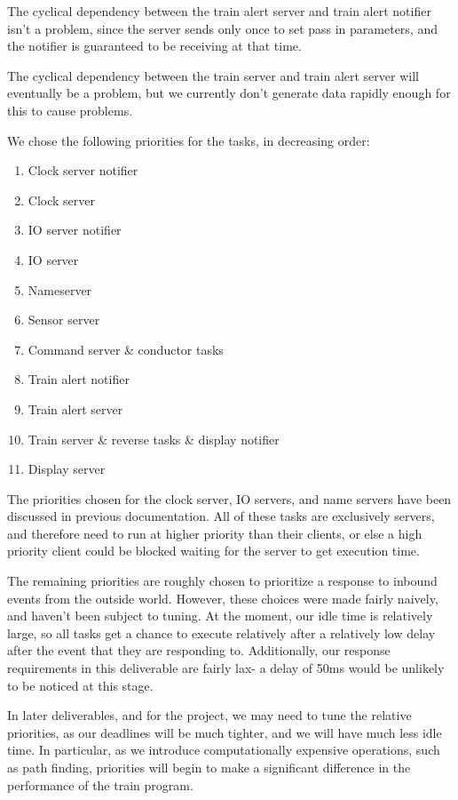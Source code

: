 \documentclass[titlepage]{article}
\begin{document}
The cyclical dependency between the train alert server and train alert notifier
isn't a problem, since the server sends only once to set pass in parameters, and
the notifier is guaranteed to be receiving at that time.

The cyclical dependency between the train server and train alert server will
eventually be a problem, but we currently don't generate data rapidly enough for
this to cause problems.

We chose the following priorities for the tasks, in decreasing order:

\begin{enumerate}
\item Clock server notifier
\item Clock server
\item IO server notifier
\item IO server
\item Nameserver
\item Sensor server
\item Command server \& conductor tasks
\item Train alert notifier
\item Train alert server
\item Train server \& reverse tasks \& display notifier
\item Display server
\end{enumerate}

The priorities chosen for the clock server, IO servers, and name servers have been
discussed in previous documentation.
All of these tasks are exclusively servers, and therefore need to run at higher
priority than their clients, or else a high priority client could be blocked waiting
for the server to get execution time.

The remaining priorities are roughly chosen to prioritize a response to inbound events from
the outside world.
However, these choices were made fairly naively, and haven't been subject to tuning.
At the moment, our idle time is relatively large, so all tasks get a chance to execute
relatively after a relatively low delay after the event that they are responding to.
Additionally, our response requirements in this deliverable are fairly lax-
a delay of 50ms would be unlikely to be noticed at this stage.

In later deliverables, and for the project, we may need to tune the relative
priorities, as our deadlines will be much tighter, and we will have much less
idle time. In particular, as we introduce computationally expensive operations,
such as path finding, priorities will begin to make a significant difference in
the performance of the train program.
\end{document}
